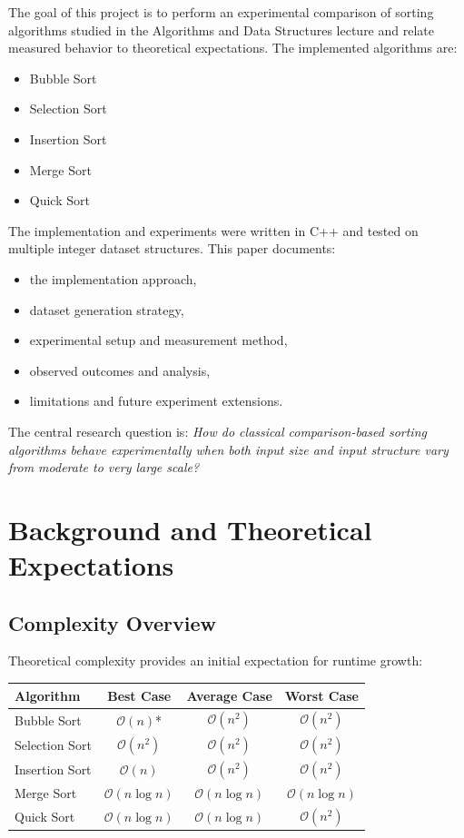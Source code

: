 \documentclass[12pt,a4paper]{article}
\begin{document}
The goal of this project is to perform an experimental comparison of sorting algorithms studied in the Algorithms and Data Structures lecture and relate measured behavior to theoretical expectations. The implemented algorithms are:
\begin{itemize}
    \item Bubble Sort
    \item Selection Sort
    \item Insertion Sort
    \item Merge Sort
    \item Quick Sort
\end{itemize}

The implementation and experiments were written in C++ and tested on multiple integer dataset structures. This paper documents:
\begin{itemize}
    \item the implementation approach,
    \item dataset generation strategy,
    \item experimental setup and measurement method,
    \item observed outcomes and analysis,
    \item limitations and future experiment extensions.
\end{itemize}

The central research question is: \emph{How do classical comparison-based sorting algorithms behave experimentally when both input size and input structure vary from moderate to very large scale?}

\section{Background and Theoretical Expectations}
\subsection{Complexity Overview}
Theoretical complexity provides an initial expectation for runtime growth:
\begin{center}
\begin{tabular}{lccc}
\toprule
Algorithm & Best Case & Average Case & Worst Case \\
\midrule
Bubble Sort & $\mathcal{O}(n)$* & $\mathcal{O}(n^2)$ & $\mathcal{O}(n^2)$ \\
Selection Sort & $\mathcal{O}(n^2)$ & $\mathcal{O}(n^2)$ & $\mathcal{O}(n^2)$ \\
Insertion Sort & $\mathcal{O}(n)$ & $\mathcal{O}(n^2)$ & $\mathcal{O}(n^2)$ \\
Merge Sort & $\mathcal{O}(n \log n)$ & $\mathcal{O}(n \log n)$ & $\mathcal{O}(n \log n)$ \\
Quick Sort & $\mathcal{O}(n \log n)$ & $\mathcal{O}(n \log n)$ & $\mathcal{O}(n^2)$ \\
\bottomrule
\end{tabular}
\end{center}
\end{document}

